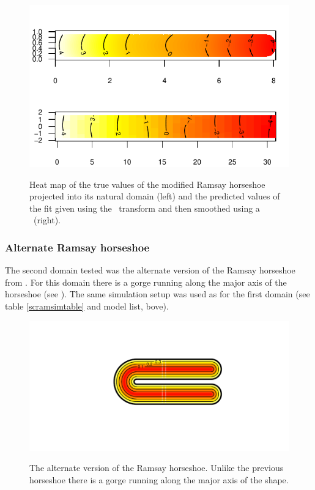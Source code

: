 \begin{figure}
\centering
\includegraphics{sc/figs/hsvisgam.pdf} \\
\caption{Heat map of the true values of the modified Ramsay horseshoe projected into its natural domain (left) and the predicted values of the fit given using the \sch\ transform and then smoothed using a \tprs\ (right).}
\label{hsvisgam}
\end{figure}

\subsubsection{Alternate Ramsay horseshoe}
\label{sc-alt-horsehoe}

The second domain tested was the alternate version of the Ramsay horseshoe from . For this domain there is a gorge running along the major axis of the horseshoe (see ). The same simulation setup was used as for the first domain (see table \ref{scramsimtable} and model list, bove).

\begin{figure}
\centering
\includegraphics[trim=0.5in 1in 0in 0.5in]{sc/figs/altramsayhorseshoe.pdf} \\
\caption{The alternate version of the Ramsay horseshoe. Unlike the previous horseshoe there is a gorge running along the major axis of the shape.}
\label{altramsayhorseshoe}
\end{figure}

